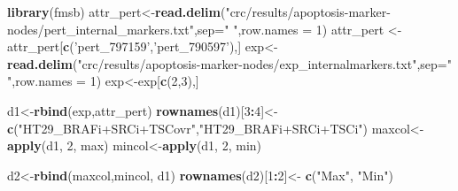 \documentclass[
]{book}
\newenvironment{Shaded}{\begin{snugshade}}{\end{snugshade}}
\newcommand{\DataTypeTok}[1]{\textcolor[rgb]{0.13,0.29,0.53}{#1}}
\newcommand{\DecValTok}[1]{\textcolor[rgb]{0.00,0.00,0.81}{#1}}
\newcommand{\KeywordTok}[1]{\textcolor[rgb]{0.13,0.29,0.53}{\textbf{#1}}}
\newcommand{\NormalTok}[1]{#1}
\newcommand{\OperatorTok}[1]{\textcolor[rgb]{0.81,0.36,0.00}{\textbf{#1}}}
\newcommand{\StringTok}[1]{\textcolor[rgb]{0.31,0.60,0.02}{#1}}
\begin{document}
\begin{Shaded}
\begin{Highlighting}[]
\KeywordTok{library}\NormalTok{(fmsb)}
\NormalTok{attr_pert<-}\KeywordTok{read.delim}\NormalTok{(}\StringTok{"crc/results/apoptosis-marker-nodes/pert_internal_markers.txt"}\NormalTok{,}\DataTypeTok{sep=}\StringTok{" "}\NormalTok{,}\DataTypeTok{row.names =} \DecValTok{1}\NormalTok{)}
\NormalTok{attr_pert <-attr_pert[}\KeywordTok{c}\NormalTok{(}\StringTok{'pert_797159'}\NormalTok{,}\StringTok{'pert_790597'}\NormalTok{),]}
\NormalTok{exp<-}\KeywordTok{read.delim}\NormalTok{(}\StringTok{"crc/results/apoptosis-marker-nodes/exp_internalmarkers.txt"}\NormalTok{,}\DataTypeTok{sep=}\StringTok{" "}\NormalTok{,}\DataTypeTok{row.names =} \DecValTok{1}\NormalTok{)}
\NormalTok{exp<-exp[}\KeywordTok{c}\NormalTok{(}\DecValTok{2}\NormalTok{,}\DecValTok{3}\NormalTok{),]}

\NormalTok{d1<-}\KeywordTok{rbind}\NormalTok{(exp,attr_pert)}
\KeywordTok{rownames}\NormalTok{(d1)[}\DecValTok{3}\OperatorTok{:}\DecValTok{4}\NormalTok{]<-}\StringTok{ }\KeywordTok{c}\NormalTok{(}\StringTok{"HT29_BRAFi+SRCi+TSCovr"}\NormalTok{,}\StringTok{"HT29_BRAFi+SRCi+TSCi"}\NormalTok{)}
\NormalTok{maxcol<-}\KeywordTok{apply}\NormalTok{(d1, }\DecValTok{2}\NormalTok{, max)}
\NormalTok{mincol<-}\KeywordTok{apply}\NormalTok{(d1, }\DecValTok{2}\NormalTok{, min)}

\NormalTok{d2<-}\KeywordTok{rbind}\NormalTok{(maxcol,mincol, d1)}
\KeywordTok{rownames}\NormalTok{(d2)[}\DecValTok{1}\OperatorTok{:}\DecValTok{2}\NormalTok{]<-}\StringTok{ }\KeywordTok{c}\NormalTok{(}\StringTok{"Max"}\NormalTok{, }\StringTok{"Min"}\NormalTok{)}


\end{Highlighting}
\end{Shaded}
\end{document}
